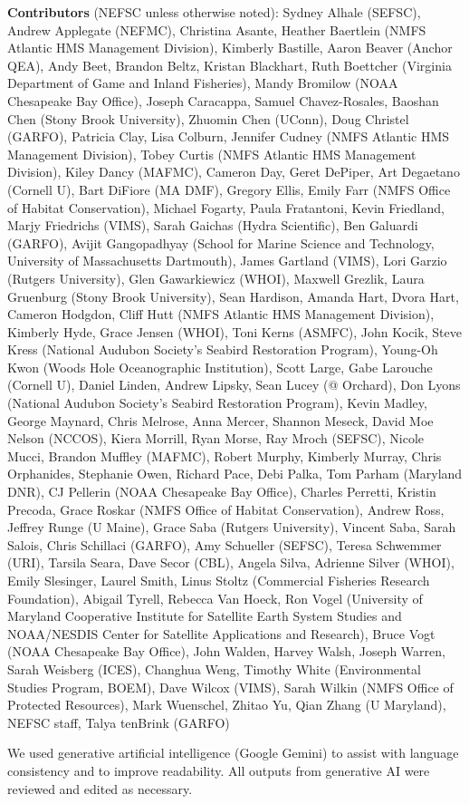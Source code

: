 \documentclass[
  10pt,
]{article}
\begin{document}
\textbf{Contributors} (NEFSC unless otherwise noted): Sydney Alhale (SEFSC), Andrew Applegate (NEFMC), Christina Asante, Heather Baertlein (NMFS Atlantic HMS Management Division), Kimberly Bastille, Aaron Beaver (Anchor QEA), Andy Beet, Brandon Beltz, Kristan Blackhart, Ruth Boettcher (Virginia Department of Game and Inland Fisheries), Mandy Bromilow (NOAA Chesapeake Bay Office), Joseph Caracappa, Samuel Chavez-Rosales, Baoshan Chen (Stony Brook University), Zhuomin Chen (UConn), Doug Christel (GARFO), Patricia Clay, Lisa Colburn, Jennifer Cudney (NMFS Atlantic HMS Management Division), Tobey Curtis (NMFS Atlantic HMS Management Division), Kiley Dancy (MAFMC), Cameron Day, Geret DePiper, Art Degaetano (Cornell U), Bart DiFiore (MA DMF), Gregory Ellis, Emily Farr (NMFS Office of Habitat Conservation), Michael Fogarty, Paula Fratantoni, Kevin Friedland, Marjy Friedrichs (VIMS), Sarah Gaichas (Hydra Scientific), Ben Galuardi (GARFO), Avijit Gangopadhyay (School for Marine Science and Technology, University of Massachusetts Dartmouth), James Gartland (VIMS), Lori Garzio (Rutgers University), Glen Gawarkiewicz (WHOI), Maxwell Grezlik, Laura Gruenburg (Stony Brook University), Sean Hardison, Amanda Hart, Dvora Hart, Cameron Hodgdon, Cliff Hutt (NMFS Atlantic HMS Management Division), Kimberly Hyde, Grace Jensen (WHOI), Toni Kerns (ASMFC), John Kocik, Steve Kress (National Audubon Society's Seabird Restoration Program), Young-Oh Kwon (Woods Hole Oceanographic Institution), Scott Large, Gabe Larouche (Cornell U), Daniel Linden, Andrew Lipsky, Sean Lucey (@ Orchard), Don Lyons (National Audubon Society's Seabird Restoration Program), Kevin Madley, George Maynard, Chris Melrose, Anna Mercer, Shannon Meseck, David Moe Nelson (NCCOS), Kiera Morrill, Ryan Morse, Ray Mroch (SEFSC), Nicole Mucci, Brandon Muffley (MAFMC), Robert Murphy, Kimberly Murray, Chris Orphanides, Stephanie Owen, Richard Pace, Debi Palka, Tom Parham (Maryland DNR), CJ Pellerin (NOAA Chesapeake Bay Office), Charles Perretti, Kristin Precoda, Grace Roskar (NMFS Office of Habitat Conservation), Andrew Ross, Jeffrey Runge (U Maine), Grace Saba (Rutgers University), Vincent Saba, Sarah Salois, Chris Schillaci (GARFO), Amy Schueller (SEFSC), Teresa Schwemmer (URI), Tarsila Seara, Dave Secor (CBL), Angela Silva, Adrienne Silver (WHOI), Emily Slesinger, Laurel Smith, Linus Stoltz (Commercial Fisheries Research Foundation), Abigail Tyrell, Rebecca Van Hoeck, Ron Vogel (University of Maryland Cooperative Institute for Satellite Earth System Studies and NOAA/NESDIS Center for Satellite Applications and Research), Bruce Vogt (NOAA Chesapeake Bay Office), John Walden, Harvey Walsh, Joseph Warren, Sarah Weisberg (ICES), Changhua Weng, Timothy White (Environmental Studies Program, BOEM), Dave Wilcox (VIMS), Sarah Wilkin (NMFS Office of Protected Resources), Mark Wuenschel, Zhitao Yu, Qian Zhang (U Maryland), NEFSC staff, Talya tenBrink (GARFO)

We used generative artificial intelligence (Google Gemini) to assist with language consistency and to improve readability. All outputs from generative AI were reviewed and edited as necessary.
\end{document}
